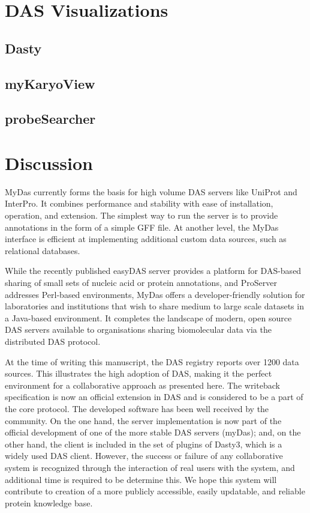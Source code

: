 	
\section{DAS Visualizations} \label{section:dasvisual}
\subsection{Dasty} \label{section:dasty}
\subsection{myKaryoView}\label{section:mykarioview}
\subsection{probeSearcher}
\section{Discussion}
MyDas currently forms the basis for high volume DAS servers like UniProt and InterPro. It combines performance and stability with ease of installation, operation, and extension. The simplest way to run the server is to provide annotations in the form of a simple GFF file. At another level, the MyDas interface is efficient at implementing additional custom data sources, such as relational databases.

While the recently published easyDAS server provides a platform for DAS-based sharing of small sets of nucleic acid or protein annotations, and ProServer addresses Perl-based environments, MyDas offers a developer-friendly solution for laboratories and institutions that wish to share medium to large scale datasets in a Java-based environment. It completes the landscape of modern, open source DAS servers available to organisations sharing biomolecular data via the distributed DAS protocol. 

At the time of writing this manuscript, the DAS registry reports over 1200 data sources. This illustrates the high adoption of DAS, making it the perfect environment for a collaborative approach as presented here. The writeback specification is now an official extension in DAS and is considered to be a part of the core protocol. The developed software has been well received by the community. On the one hand, the server implementation is now part of the official development of one of the more stable DAS servers (myDas); and, on the other hand, the client is included in the set of plugins of Dasty3, which is a widely used DAS client. However, the success or failure of any collaborative system is recognized through the interaction of real users with the system, and additional time is required to be determine this. We hope this system will contribute to creation of a more publicly accessible, easily updatable, and reliable protein knowledge base.

